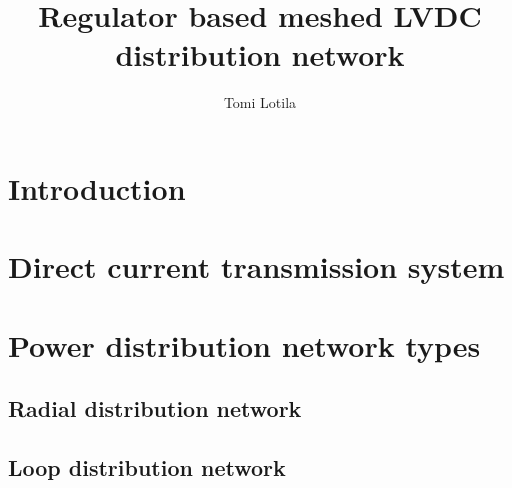\documentclass{report}
\begin{document}
\title{Regulator based meshed LVDC distribution network}
\author{Tomi Lotila}
\maketitle

\tableofcontents


\listoffigures

\chapter{Introduction}




\chapter{Direct current transmission system}

\paragraph{} 


\chapter{Power distribution network types}

\section{Radial distribution network} 
\section{Loop distribution network} 
\end{document}
